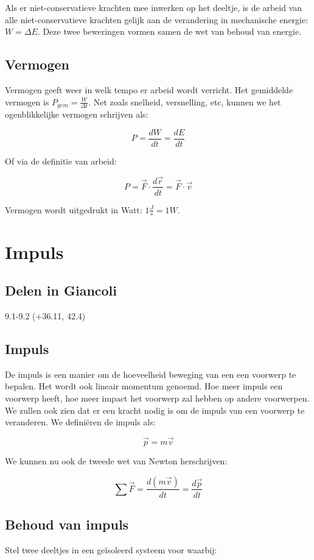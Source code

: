 \documentclass[12pt,a4paper]{article}
\begin{document}
    Als er niet-conservatieve krachten mee inwerken op het deeltje, 
    is de arbeid van alle niet-conservatieve krachten gelijk aan de verandering
    in mechanische energie: $W = \Delta E$. Deze twee beweringen vormen
    samen de wet van behoud van energie.
    
    \subsection{Vermogen}
    Vermogen geeft weer in welk tempo er arbeid wordt verricht. Het gemiddelde vermogen is
    $P_{gem} = \frac{W}{\Delta t}$. Net zoals snelheid, versnelling, etc, kunnen we het ogenblikkelijke vermogen
    schrijven als:
    
    $$P = \frac{dW}{dt} = \frac{dE}{dt}$$
    
    Of via de definitie van arbeid:
    
    $$P = \vec{F} \cdot \frac{d\vec{r}}{dt} = \vec{F} \cdot \vec{v}$$ 
    
     Vermogen wordt uitgedrukt in Watt: $1 \frac{J}{s} = 1 W$.

    \section{Impuls}

    \subsection{Delen in Giancoli}
    9.1-9.2 (+36.11, 42.4)

    \subsection{Impuls}
    De impuls is een manier om de hoeveelheid beweging van een een voorwerp te
    bepalen. Het wordt ook lineair momentum genoemd. Hoe meer impuls een voorwerp
    heeft, hoe meer impact het voorwerp zal hebben op andere voorwerpen. We zullen
    ook zien dat er een kracht nodig is om de impuls van een voorwerp te veranderen. We
    definiëren de impuls als:
    
    $$\vec{p} = m\vec{v}$$
    
    We kunnen nu ook de tweede wet van Newton herschrijven:
    
    $$\sum \vec{F} = \frac{d(m\vec{v})}{dt} = \frac{d\vec{p}}{dt}$$

    \subsection{Behoud van impuls}
    Stel twee deeltjes in een geïsoleerd systeem voor waarbij:
    
\end{document}
